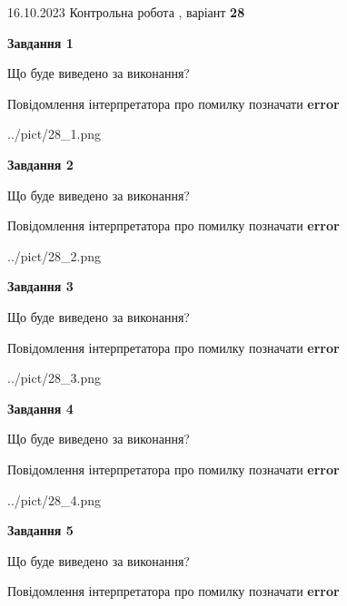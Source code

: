 \documentclass[12pt, ukrainian]{article}
\begin{document}
{\Large{16.10.2023 Контрольна робота , варіант  \No \textbf { 28 }\par}}
{
\begin {large}
{\begin {center}\textbf{Завдання 1}\end {center}}\par
Що буде виведено за виконання? \par
Повідомлення інтерпретатора про помилку позначати \textbf{error}

\begin{center}
	{../pict/28_1.png}
\end{center}
\newpage

{\begin {center}\textbf{Завдання 2}\end {center}}\par
Що буде виведено за виконання? \par
Повідомлення інтерпретатора про помилку позначати \textbf{error}

\begin{center}
	{../pict/28_2.png}
\end{center}
\newpage

{\begin {center}\textbf{Завдання 3}\end {center}}\par
Що буде виведено за виконання? \par
Повідомлення інтерпретатора про помилку позначати \textbf{error}

\begin{center}
	{../pict/28_3.png}
\end{center}
\newpage

{\begin {center}\textbf{Завдання 4}\end {center}}\par
Що буде виведено за виконання? \par
Повідомлення інтерпретатора про помилку позначати \textbf{error}

\begin{center}
	{../pict/28_4.png}
\end{center}
\newpage

{\begin {center}\textbf{Завдання 5}\end {center}}\par
Що буде виведено за виконання? \par
Повідомлення інтерпретатора про помилку позначати \textbf{error}


\end{large}}
\end{document}
